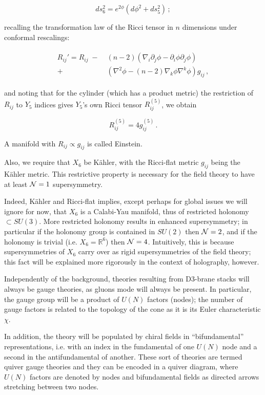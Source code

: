 \begin{equation}
	ds_6^2 = e^{2\phi} \left( d\phi^2 + ds_5^2 \right)\,;
\end{equation}

recalling the transformation law of the Ricci tensor in $n$ dimensions under conformal rescalings:

\begin{align}
	\begin{split}
	R_{ij}' = R_{ij} \; - &\; (n-2)\left( \nabla_i \partial_j \phi - \partial_i \phi \partial_j \phi \right) \\+ &\; \left( \nabla^2 \phi - (n-2) \nabla_k \phi \nabla^k \phi \right) g_{ij}\,,
\end{split}
\end{align}

and noting that for the cylinder (which has a product metric) the restriction of $R_{ij}$ to $Y_5$ indices gives $Y_5$'s own Ricci tensor $R_{ij}^{(5)}$, we obtain

\begin{equation}
	R^{(5)}_{ij} = 4 g_{ij}^{(5)}\,.
\end{equation}

A manifold with $R_{ij} \propto g_{ij}$ is called Einstein.

Also, we require that $X_6$ be K\"ahler, with the Ricci-flat metric $g_{ij}$ being the K\"ahler metric. This restrictive property is necessary\cite{KW_SCFT} for the field theory to have at least $\mathcal{N} = 1$ supersymmetry.

Indeed, K\"ahler and Ricci-flat implies, except perhaps for global issues we will ignore for now, that $X_6$ is a Calabi-Yau manifold, thus of restricted holonomy $\subset SU(3)$. More restricted holonomy results in enhanced supersymmetry; in particular if the holonomy group is contained in $SU(2)$ then $\mathcal{N} = 2$, and if the holonomy is trivial (i.e. $X_6 = \mathbb{R}^6$) then $\mathcal{N} = 4$. Intuitively, this is because supersymmetries of $X_6$ carry over as rigid supersymmetries of the field theory; this fact will be explained more rigorously in the context of holography, however.

Independently of the background, theories resulting from D3-brane stacks will always be gauge theories, as gluons mode will always be present. In particular, the gauge group will be a product of $U(N)$ factors (nodes); the number of gauge factors is related to the topology of the cone as it is its Euler characteristic $\chi$.

In addition, the theory will be populated by chiral fields in ``bifundamental'' representations, i.e. with an index in the fundamental of one $U(N)$ node and a second in the antifundamental of another. These sort of theories are termed quiver gauge theories and they can be encoded in a quiver diagram, where $U(N)$ factors are denoted by nodes and bifundamental fields as directed arrows stretching between two nodes.


